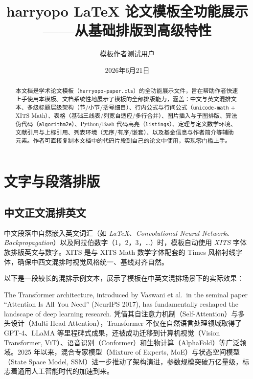 \documentclass{harryopo-paper}
\title{harryopo LaTeX 论文模板全功能展示\\——从基础排版到高级特性}
\author{模板作者\quad 测试用户}
\date{2026年6月21日}
\begin{document}
\maketitle

\begin{abstract}
本文档是学术论文模板（\texttt{harryopo-paper.cls}）的全功能展示文件，旨在帮助作者快速上手使用本模板。文档系统性地展示了模板的全部排版能力，涵盖：中文与英文混排文本、多级标题层级架构（节/小节/括号细目）、行内公式与行间公式（\texttt{unicode-math} + XITS Math）、表格（基础三线表/列宽自适应/多行合并）、图片插入与子图排版、算法伪代码（\texttt{algorithm2e}）、Python/Bash 代码高亮（\texttt{listings}）、定理与定义数学环境、文献引用与上标引用、列表环境（无序/有序/嵌套）、以及基金信息与作者简介等辅助元素。作者可直接复制本文档中的代码片段到自己的论文中使用，实现零门槛上手。
\end{abstract}


\section{文字与段落排版}
\label{sec:text}

\subsection{中文正文混排英文}

中文段落中自然嵌入英文词汇（如 \emph{LaTeX}、\emph{Convolutional Neural Network}、\emph{Backpropagation}）以及阿拉伯数字（1，2，3，…）时，模板自动使用 \emph{XITS} 字体族排版英文与数字。XITS 是与 XITS Math 数学字体配套的 Times 风格衬线字体，确保中西文混排时视觉风格统一、基线对齐自然。

以下是一段较长的混排示例文本，展示了模板在中英文混排场景下的实际效果：

The Transformer architecture, introduced by Vaswani et al.\ in the seminal paper \textquotedblleft Attention Is All You Need\textquotedblright{} (NeurIPS 2017), has fundamentally reshaped the landscape of deep learning research. 凭借其自注意力机制（Self-Attention）与多头设计（Multi-Head Attention），Transformer 不仅在自然语言处理领域取得了 GPT-4、LLaMA 等里程碑式成果，还被成功迁移到计算机视觉（Vision Transformer, ViT）、语音识别（Conformer）和生物计算（AlphaFold）等广泛领域。2025 年以来，混合专家模型（Mixture of Experts, MoE）与状态空间模型（State Space Model, SSM）进一步推动了架构演进，参数规模突破万亿量级，标志着通用人工智能时代的加速到来。
\end{document}
